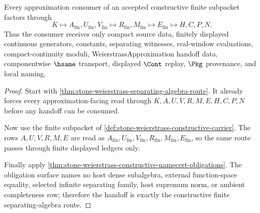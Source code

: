 \begin{theorem}
\label{thm:stone-weierstrass-constructive-separating-algebra-handoff}
Every approximation consumer of an accepted constructive finite subpacket factors through
$$
K \longmapsto A_{\mathrm{fin}},U_{\mathrm{fin}},V_{\mathrm{fin}}
  \longmapsto R_{\mathrm{fin}},M_{\mathrm{fin}}
  \longmapsto E_{\mathrm{fin}}
  \longmapsto H,C,P,N .
$$
Thus the consumer receives only compact source data, finitely displayed continuous generators, constants, separating witnesses, real-window evaluations, compact-continuity moduli, WeierstrassApproximation handoff data, componentwise $\hsame$ transport, displayed $\Cont$ replay, $\Pkg$ provenance, and local naming.
\end{theorem}
\begin{proof}
Start with \autoref{thm:stone-weierstrass-separating-algebra-route}. It already forces every approximation-facing read through $K,A,U,V,R,M,E,H,C,P,N$ before any handoff can be consumed.

Now use the finite subpacket of \autoref{def:stone-weierstrass-constructive-carrier}. The rows $A,U,V,R,M,E$ are read as $A_{\mathrm{fin}},U_{\mathrm{fin}},V_{\mathrm{fin}},R_{\mathrm{fin}},M_{\mathrm{fin}},E_{\mathrm{fin}}$, so the same route passes through finite displayed ledgers only.

Finally apply \autoref{thm:stone-weierstrass-constructive-namecert-obligations}. The obligation surface names no host dense subalgebra, external function-space equality, selected infinite separating family, host supremum norm, or ambient completeness row; therefore the handoff is exactly the constructive finite separating-algebra route.
\end{proof}



